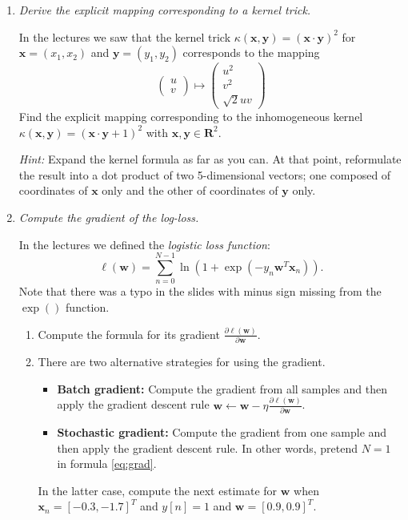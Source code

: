 \documentclass[a4paper,12pt]{scrartcl}
\newcommand{\x}{\mathbf{ x}}
\newcommand{\y}{\mathbf{ y}}
\newcommand{\w}{\mathbf{ w}}
\newcommand{\R}{\mathbf{ R}}
\newcommand{\pen}{{\fbox{\texttt{\bfseries pen\&paper}}\quad}}
\begin{document}
\begin{enumerate}

\item \pen \emph{Derive the explicit mapping corresponding to a kernel trick.}

In the lectures we saw that the kernel trick $\kappa(\x, \y) = (\x \cdot \y)^2$
for $\x = (x_1,x_2)$ and $\y = (y_1,y_2)$ corresponds to the mapping 
\[
\begin{pmatrix}
u \\ v
\end{pmatrix}
\mapsto 
\begin{pmatrix}
u^2\\
v^2\\
\sqrt{2}u v
\end{pmatrix}
\]
Find the explicit mapping corresponding to the inhomogeneous kernel
$\kappa(\x, \y) = (\x \cdot \y + 1)^2$ with $\x, \y\in\R^2$.

\emph{Hint:} Expand the kernel formula as far as you can. 
At that point, reformulate the result into a dot product of
two 5-dimensional vectors; one composed of coordinates of $\x$ only
and the other of coordinates of $\y$ only.

\item \pen \emph{Compute the gradient of the log-loss.}

In the lectures we defined the \emph{logistic loss function}:
\begin{equation}
\ell(\w) = \sum_{n = 0}^{N-1} \ln(1 + \exp(-y_n\w^T\x_n)).
\label{eq:grad}
\end{equation}
Note that there was a typo in the slides with minus sign missing from the $\exp()$ function.

\begin{enumerate}
	\item Compute the formula for its gradient $\frac{\partial \ell(\w) }{\partial \w}$.
	\item There are two alternative strategies for using the gradient.
	\begin{itemize}
		\item \textbf{Batch gradient:} Compute the gradient from all samples and then apply the gradient descent rule
		$\w \leftarrow \w - \eta \frac{\partial \ell(\w) }{\partial \w}$.
		\item \textbf{Stochastic gradient:} Compute the gradient from one sample and then apply the gradient descent rule.
		In other words, pretend $N = 1$ in formula \ref{eq:grad}.
	\end{itemize}
	In the latter case, compute the next estimate for $\w$ when $\x_n = [-0.3, -1.7]^T$ and
	$y[n] = 1$ and $\w =[  0.9,  0.9]^T$.
\end{enumerate}


\end{enumerate}
\end{document}
